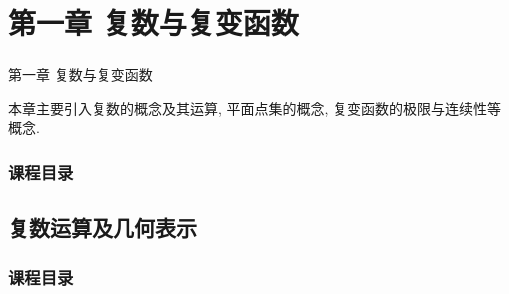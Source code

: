 \documentclass{beamer}
\begin{document}
%
%
%
%
\section{第一章 \quad 复数与复变函数}
%
%

\begin{frame}

\frametitle{}

\begin{block}{\begin{center}
  \Huge{第一章 \quad 复数与复变函数}
\end{center}}
本章主要引入复数的概念及其运算, 平面点集的概念, 复变函数的极限与连续性等概念. 
\end{block}


\end{frame}
%
%
%

\begin{frame}[t]
\frametitle{课程目录}
\tableofcontents %



\end{frame}

\subsection{复数运算及几何表示}

\begin{frame}[t]
\frametitle{课程目录}
\tableofcontents[currentsubsection ] %
\end{frame}
\end{document}
